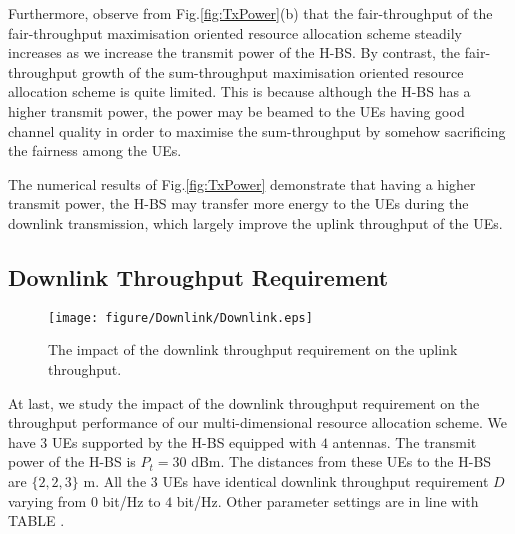 \documentclass[12pt,draft,onecolumn,journal]{IEEEtran}
\begin{document}
Furthermore, observe from Fig.\ref{fig:TxPower}(b) that the fair-throughput of the fair-throughput maximisation oriented resource allocation scheme steadily increases as we increase the transmit power of the H-BS. By contrast, the fair-throughput growth of the sum-throughput maximisation oriented resource allocation scheme is quite limited. This is because although the H-BS has a higher transmit power, the power may be beamed to the UEs having good channel quality in order to maximise the sum-throughput by somehow sacrificing the fairness among the UEs.

The numerical results of Fig.\ref{fig:TxPower} demonstrate that having a higher transmit power, the H-BS may transfer more energy to the UEs during the downlink transmission, which largely improve the uplink throughput of the UEs. 

\subsection{Downlink Throughput Requirement}

\begin{figure}[!t]
\centering
\texttt{[image: figure/Downlink/Downlink.eps]}
\setlength{\abovecaptionskip}{0pt}
\setlength{\belowcaptionskip}{0pt}\caption{The impact of the downlink throughput requirement on the uplink throughput.}
\label{fig:Downlink}
\end{figure}

At last, we study the impact of the downlink throughput requirement on the throughput performance of our multi-dimensional resource allocation scheme. We have $3$ UEs supported by the H-BS equipped with $4$ antennas. The transmit power of the H-BS is $P_t = 30$ dBm. The distances from these UEs to the H-BS are $\{2,2,3\}$ m. All the $3$ UEs have identical downlink throughput requirement $D$ varying from $0$ bit/Hz to $4$ bit/Hz. Other parameter settings are in line with TABLE \uppercase\expandafter{}.
\end{document}

